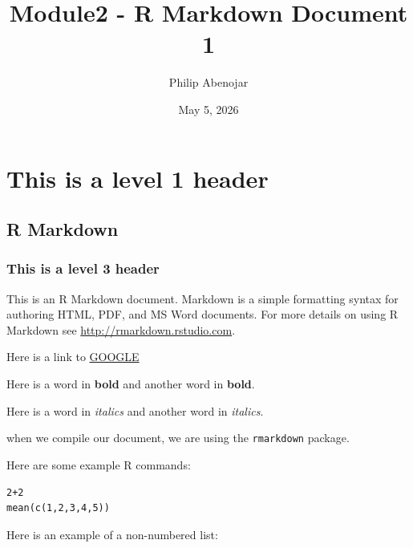 \documentclass[
]{article}
\title{Module2 - R Markdown Document 1}
\author{Philip Abenojar}
\date{May 5, 2026}
\begin{document}
\maketitle

\section{This is a level 1 header}\label{this-is-a-level-1-header}

\subsection{R Markdown}\label{r-markdown}

\subsubsection{This is a level 3 header}\label{this-is-a-level-3-header}

This is an R Markdown document. Markdown is a simple formatting syntax
for authoring HTML, PDF, and MS Word documents. For more details on
using R Markdown see \url{http://rmarkdown.rstudio.com}.

Here is a link to \href{http://google.com}{GOOGLE}

Here is a word in \textbf{bold} and another word in \textbf{bold}.

Here is a word in \emph{italics} and another word in \emph{italics}.

when we compile our document, we are using the \texttt{rmarkdown}
package.

Here are some example R commands:

\begin{verbatim}
2+2
mean(c(1,2,3,4,5))
\end{verbatim}

Here is an example of a non-numbered list:
\end{document}
